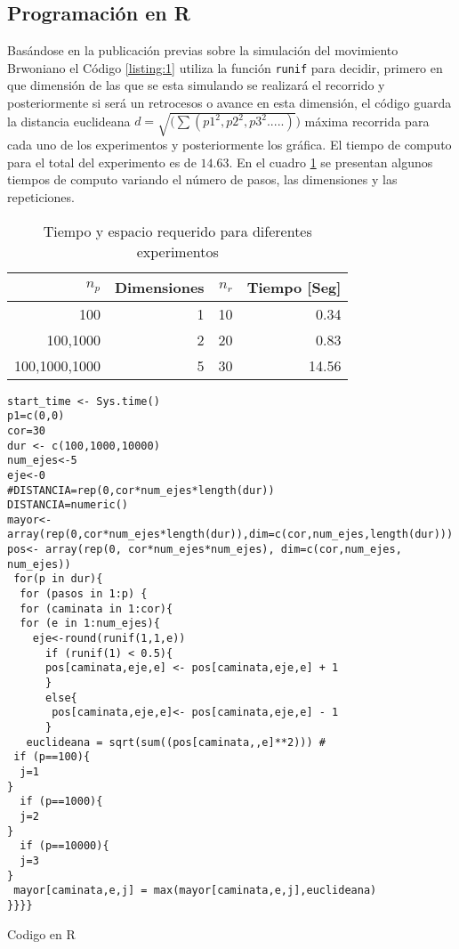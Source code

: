 \documentclass{article}
\renewcommand\lstlistingname{Código}
\begin{document}
\subsection{Programación en R}
Basándose en la publicación previas sobre la simulación del movimiento Brwoniano \citep{E.Schaaefer} el  Código \ref{listing:1} utiliza la función  \texttt{runif} para decidir, primero en que dimensión de las que se esta simulando se realizará el recorrido y posteriormente si será un retrocesos o avance en esta dimensión, el código guarda la distancia euclideana $d=\sqrt{(\sum(p1^2,p2^2,p3^2.....)})$ máxima recorrida  para cada uno de los experimentos y posteriormente los gráfica. El tiempo de computo para el total del experimento es de $14.63$. En el cuadro \ref{cuadro 1} se presentan algunos tiempos de computo variando el número de pasos, las dimensiones y las repeticiones.

\begin{table}[]
\centering
\caption{Tiempo y espacio requerido para diferentes experimentos}
\label{cuadro 1}
\begin{tabular}{|r|r|r|r|}
\hline
\textbf{$n_p$} & \textbf{Dimensiones} & \textbf{$n_r$} & \textbf{Tiempo {[}Seg{]}} \\ \hline
100            & 1                    & 10                    & 0.34                      \\ \hline
100,1000       & 2                    & 20                    & 0.83                      \\ \hline
100,1000,1000  & 5                    & 30                    & 14.56                     \\ \hline        
\end{tabular}
\end{table}
\lstset{language=Python}
\lstset{frame=lines}
\lstset{basicstyle=\footnotesize}
\begin{listing}
\renewcommand\lstlistingname{Código}
\begin{verbatim}
start_time <- Sys.time()
p1=c(0,0)
cor=30
dur <- c(100,1000,10000)
num_ejes<-5
eje<-0
#DISTANCIA=rep(0,cor*num_ejes*length(dur))
DISTANCIA=numeric()
mayor<-array(rep(0,cor*num_ejes*length(dur)),dim=c(cor,num_ejes,length(dur)))
pos<- array(rep(0, cor*num_ejes*num_ejes), dim=c(cor,num_ejes, num_ejes))
 for(p in dur){
  for (pasos in 1:p) {
  for (caminata in 1:cor){
  for (e in 1:num_ejes){
    eje<-round(runif(1,1,e))
      if (runif(1) < 0.5){
      pos[caminata,eje,e] <- pos[caminata,eje,e] + 1
      }
      else{
       pos[caminata,eje,e]<- pos[caminata,eje,e] - 1
      }
   euclideana = sqrt(sum((pos[caminata,,e]**2))) # 
 if (p==100){
  j=1
}
  if (p==1000){
  j=2
}
  if (p==10000){
  j=3
}
 mayor[caminata,e,j] = max(mayor[caminata,e,j],euclideana)
}}}}

\end{verbatim}
\caption{Codigo en R}
\label{listing:1}
\end{listing}
\end{document}
